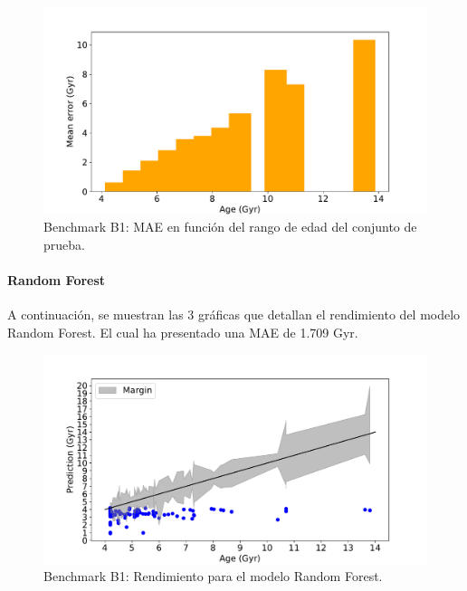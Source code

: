 \begin{figure}[H]
\begin{center}
 \includegraphics[width=0.8\linewidth]{Figuras/Experimentos/B_B1_knn_3.pdf}
\end{center}
\caption{Benchmark B1: MAE en función del rango de edad del conjunto de prueba.}
 \label{fig:benchB1_details_knn_3}
\end{figure}

\paragraph{Random Forest} 
A continuación, se muestran las 3 gráficas que detallan el rendimiento del modelo Random Forest. El cual ha presentado una MAE de 1.709 Gyr.

\begin{figure}[H]
\begin{center}
 \includegraphics[width=0.8\linewidth]{Figuras/Experimentos/B_B1_rf_1.pdf}
\end{center}
\caption{Benchmark B1: Rendimiento para el modelo Random Forest.}
 \label{fig:benchB1_details_rf_1}
\end{figure}


